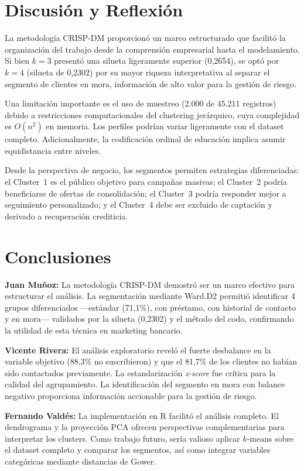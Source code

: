 \documentclass[10pt,a4paper]{article}
\begin{document}
\section{Discusión y Reflexión}

La metodología CRISP-DM proporcionó un marco estructurado que facilitó la organización del trabajo desde la comprensión empresarial hasta el modelamiento. Si bien $k = 3$ presentó una silueta ligeramente superior (0,2654), se optó por $k = 4$ (silueta de 0,2302) por su mayor riqueza interpretativa al separar el segmento de clientes en mora, información de alto valor para la gestión de riesgo.

Una limitación importante es el uso de muestreo (2.000 de 45.211 registros) debido a restricciones computacionales del clustering jerárquico, cuya complejidad es $O(n^2)$ en memoria. Los perfiles podrían variar ligeramente con el dataset completo. Adicionalmente, la codificación ordinal de educación implica asumir equidistancia entre niveles.

Desde la perspectiva de negocio, los segmentos permiten estrategias diferenciadas: el Cluster~1 es el público objetivo para campañas masivas; el Cluster~2 podría beneficiarse de ofertas de consolidación; el Cluster~3 podría responder mejor a seguimiento personalizado; y el Cluster~4 debe ser excluido de captación y derivado a recuperación crediticia.

\section{Conclusiones}

\textbf{Juan Muñoz:} La metodología CRISP-DM demostró ser un marco efectivo para estructurar el análisis. La segmentación mediante Ward.D2 permitió identificar 4 grupos diferenciados ---estándar (71,1\%), con préstamo, con historial de contacto y en mora--- validados por la silueta (0,2302) y el método del codo, confirmando la utilidad de esta técnica en marketing bancario.

\textbf{Vicente Rivera:} El análisis exploratorio reveló el fuerte desbalance en la variable objetivo (88,3\% no suscribieron) y que el 81,7\% de los clientes no habían sido contactados previamente. La estandarización \textit{z-score} fue crítica para la calidad del agrupamiento. La identificación del segmento en mora con balance negativo proporciona información accionable para la gestión de riesgo.

\textbf{Fernando Valdés:} La implementación en R facilitó el análisis completo. El dendrograma y la proyección PCA ofrecen perspectivas complementarias para interpretar los clusters. Como trabajo futuro, sería valioso aplicar $k$-means sobre el dataset completo y comparar los segmentos, así como integrar variables categóricas mediante distancias de Gower.
\end{document}
